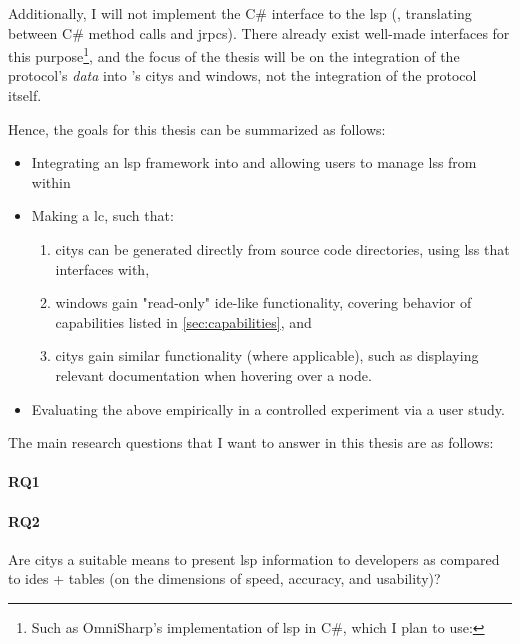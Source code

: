 \documentclass[../thesis]{subfiles}
\begin{document}
Additionally, I will not implement the C\# interface to the \gls{lsp} (\ie, translating between C\# method calls and \glspl{jrpc}).
There already exist well-made interfaces for this purpose\footnote{
	Such as OmniSharp's implementation of \gls{lsp} in C\#, which I plan to use:
}, and the focus of the thesis will be on the integration of the protocol's \emph{data} into \SEE{}'s \glspl{city} and \glspl{window}, not the integration of the protocol itself.

Hence, the goals for this thesis can be summarized as follows:
\begin{itemize}
	\item Integrating an \gls{lsp} framework into \SEE{} and allowing users to manage \glspl{ls} from within \SEE{}
	\item Making \SEE{} a \gls{lc}, such that:
	      \begin{enumerate}
		      \item \Glspl{city} can be generated directly from source code directories, using \glspl{ls} that \SEE{} interfaces with,
		      \item \glspl{window} gain "read-only" \gls{ide}-like functionality, covering behavior of capabilities listed in \cref{sec:capabilities}, and
		      \item \Glspl{city} gain similar functionality (where applicable), such as displaying relevant documentation when hovering over a node.
	      \end{enumerate}
	\item Evaluating the above empirically in a controlled experiment via a user study.
\end{itemize}

The main research questions that I want to answer in this thesis are as follows:
\vspace{-1.5em}
\paragraph{RQ1}
\vspace{-1.5em}
\paragraph{RQ2}
Are \glspl{city} a suitable means to present \gls{lsp} information to developers as compared to \glspl{ide} + tables (on the dimensions of speed, accuracy, and usability)?
\end{document}
